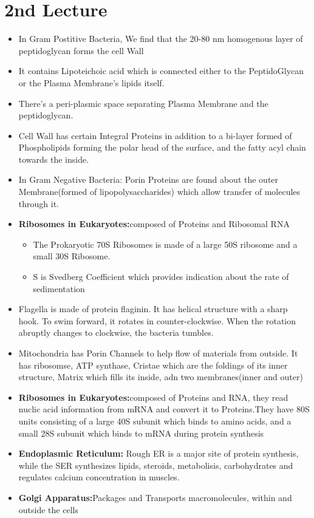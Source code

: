 \documentclass{article}
\begin{document}
\section{2nd Lecture}
\begin{itemize}
    \item In Gram Postitive Bacteria, We find that the 20-80 nm homogenous layer of peptidoglycan forms the cell Wall
    \item It contains Lipoteichoic acid which is connected either to the PeptidoGlycan or the Plasma Membrane's lipids itself.
    \item There's a peri-plasmic space separating Plasma Membrane and the peptidoglycan.
    \item Cell Wall has certain Integral Proteins in addition to a bi-layer formed of Phospholipids forming the polar head of the surface, and the fatty acyl chain towards the inside.
    \item In Gram Negative Bacteria: Porin Proteins are found about the outer Membrane(formed of lipopolysaccharides) which allow transfer of molecules through it.
    \item \textbf{Ribosomes in Eukaryotes:}composed of Proteins and Ribosomal RNA
    \begin{itemize}
      \item The Prokaryotic 70S Ribosomes is made of a large 50S ribosome and a small 30S Ribosome.
      \item S is Svedberg Coefficient which provides indication about the rate of sedimentation
    \end{itemize}
      \item Flagella is made of protein flaginin. It has helical structure with a sharp hook. To swim forward, it rotates in counter-clockwise. When the rotation abruptly changes to clockwise, the bacteria tumbles.
    \item Mitochondria has Porin Channels to help flow of materials from outside. It has ribosomse, ATP synthase, Cristae which are the foldings of its inner structure, Matrix which fills its inside, adn two membranes(inner and outer)
    \item \textbf{Ribosomes in Eukaryotes:}composed of Proteins and RNA, they read nuclic acid information from mRNA and convert it to Proteins.They have 80S units consisting of a large 40S subunit which binds to amino acids, and a small 28S subunit which binds to mRNA during protein synthesis
    \item \textbf{Endoplasmic Reticulum:} Rough ER is a major site of protein synthesis, while the SER synthesizes lipids, steroids, metabolisis, carbohydrates and regulates calcium concentration in muscles.
    \item \textbf{Golgi Apparatus:}Packages and Transports macromolecules, within and outside the cells


\end{itemize}
\end{document}
